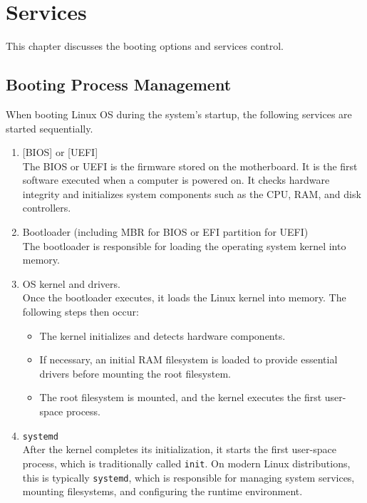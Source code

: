 \chapter{Services} \label{ch:services}

This chapter discusses the booting options and services control.

\section{Booting Process Management}

When booting Linux OS during the system's startup, the following services are started sequentially.

\begin{enumerate}
  \item {}[BIOS] or [UEFI] \\
  The BIOS or UEFI is the firmware stored on the motherboard. It is the first software executed when a computer is powered on. It checks hardware integrity and initializes system components such as the CPU, RAM, and disk controllers.
  
  \item Bootloader (including MBR for BIOS or EFI partition for UEFI) \\
  The bootloader is responsible for loading the operating system kernel into memory.
  
  \item OS kernel and drivers. \\
  Once the bootloader executes, it loads the Linux kernel into memory. The following steps then occur:
  \begin{itemize}
      \item The kernel initializes and detects hardware components.
      \item If necessary, an initial RAM filesystem is loaded to provide essential drivers before mounting the root filesystem.
      \item The root filesystem is mounted, and the kernel executes the first user-space process.
  \end{itemize}
  
  \item \texttt{systemd} \\
  After the kernel completes its initialization, it starts the first user-space process, which is traditionally called \texttt{init}. On modern Linux distributions, this is typically \texttt{systemd}, which is responsible for managing system services, mounting filesystems, and configuring the runtime environment.
  

\end{enumerate}
